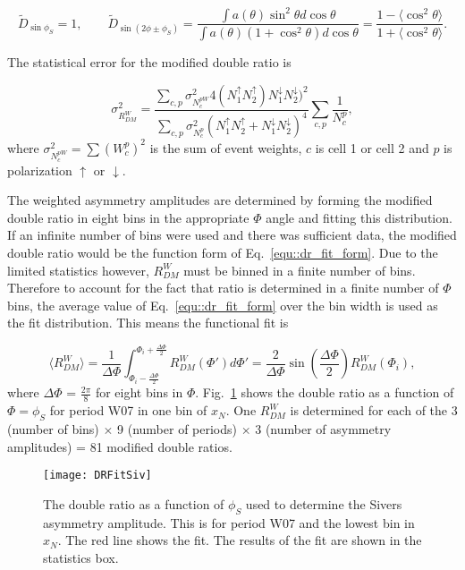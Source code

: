 \begin{equation}
  \tilde{D}_{\sin\phi_S} = 1, \quad\quad \tilde{D}_{\sin(2\phi\pm\phi_S)} =
  \frac{\int a(\theta)\sin^2\theta d\cos\theta} {\int a(\theta)(1+\cos^2\theta)
    d\cos\theta} = \frac{1-\langle \cos^2\theta\rangle} {1+\langle
    \cos^2\theta\rangle}.
\end{equation}

The statistical error for the modified double ratio is

\begin{equation}
  \sigma^2_{R^W_{DM}} = \frac{\sum_{c,p} \sigma^2_{N_c^{pW}}
    4(N^{\uparrow}_1N^{\uparrow}_2)N^{\downarrow}_1N^{\downarrow}_2)^2}
        {\sum_{c,p} \sigma^2_{N_c^{p}}
          (N^{\uparrow}_1N^{\uparrow}_2 + N^{\downarrow}_1N^{\downarrow}_2)^4}
        \sum_{c,p}\frac{1}{N_c^p},
\end{equation}
\noindent
where $\sigma^2_{N_c^{pW}} = \sum (W^p_c)^2$ is the sum of event weights, $c$ is
cell 1 or cell 2 and $p$ is polarization $\uparrow$ or $\downarrow$.

The weighted asymmetry amplitudes are determined by forming the modified double
ratio in eight bins in the appropriate $\Phi$ angle and fitting this
distribution.  If an infinite number of bins were used and there was sufficient
data, the modified double ratio would be the function form of
Eq.~\ref{equ::dr_fit_form}.  Due to the limited statistics however, $R^W_{DM}$
must be binned in a finite number of bins.  Therefore to account for the fact
that ratio is determined in a finite number of $\Phi$ bins, the average value of
Eq.~\ref{equ::dr_fit_form} over the bin width is used as the fit distribution.
This means the functional fit is

\begin{equation}
  \langle R^W_{DM} \rangle = \frac{1}{\Delta\Phi}
  \int_{\Phi_i-\frac{\Delta\Phi}{2}}^{\Phi_i+\frac{\Delta\Phi}{2}}
  R^W_{DM}(\Phi') d\Phi' =
  \frac{2}{\Delta\Phi}\sin(\frac{\Delta\Phi}{2})R^W_{DM}(\Phi_i),
\end{equation}
\noindent
where $\Delta\Phi$ = $\frac{2\pi}{8}$ for eight bins in $\Phi$.
Fig.~\ref{fig::DRFitSiv} shows the double ratio as a function of $\Phi=\phi_S$
for period W07 in one bin of $x_N$.  One $R^W_{DM}$ is determined for each of
the 3 (number of bins) $\times$ 9 (number of periods) $\times$ 3 (number of
asymmetry amplitudes) = 81 modified double ratios.

\begin{figure}[h!t]
  \centering \texttt{[image: DRFitSiv]}
  \caption{The double ratio as a function of $\phi_S$ used to determine the
    Sivers asymmetry amplitude.  This is for period W07 and the lowest bin in
    $x_N$.  The red line shows the fit.  The results of the fit are shown in the
    statistics box.}
  \label{fig::DRFitSiv}
\end{figure}

